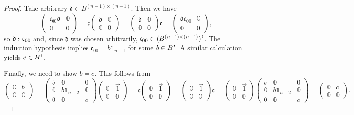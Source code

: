 \begin{proof}
Take arbitrary $\mathfrak{d} \in B^{(n-1)\times (n-1)}$. Then we have
\[ \begin{pmatrix}
\mathfrak{c}_{00}\mathfrak{d} & \mathbb{0} \\ \mathbb{0} & 0
\end{pmatrix} = \mathfrak{c}\begin{pmatrix}
\mathfrak{d} & \mathbb{0} \\ \mathbb{0} & 0
\end{pmatrix} = \begin{pmatrix}
\mathfrak{d} & \mathbb{0} \\ \mathbb{0} & 0
\end{pmatrix}\mathfrak{c} = \begin{pmatrix}
\mathfrak{d}\mathfrak{c}_{00} & \mathbb{0} \\ \mathbb{0} & 0
\end{pmatrix}, \]
so $\mathfrak{d}\comm \mathfrak{c}_{00}$ and, since $\mathfrak{d}$ was chosen arbitrarily, $\mathfrak{c}_{00} \in (B^{(n-1)\times (n-1)})^{\comm}$. The induction hypothesis implies $\mathfrak{c}_{00} = b \mathbb{1}_{n-1}$ for some $b\in B^{\comm}$. A similar calculation yields $c\in B^{\comm}$.

Finally, we need to show $b = c$. This follows from
\[ \begin{pmatrix}
\mathbb{0} & b \\ \mathbb{0} & \mathbb{0}
\end{pmatrix} = \begin{pmatrix}
b & \mathbb{0} & 0 \\
\mathbb{0} & b \mathbb{1}_{n-2} & \mathbb{0} \\
0 & \mathbb{0} & c
\end{pmatrix}\begin{pmatrix}
\mathbb{0} & \vec{1} \\ \mathbb{0} & \mathbb{0}
\end{pmatrix} = \mathfrak{c}\begin{pmatrix}
\mathbb{0} & \vec{1} \\ \mathbb{0} & \mathbb{0}
\end{pmatrix} = \begin{pmatrix}
\mathbb{0} & \vec{1} \\ \mathbb{0} & \mathbb{0}
\end{pmatrix}\mathfrak{c} = \begin{pmatrix}
\mathbb{0} & \vec{1} \\ \mathbb{0} & \mathbb{0}
\end{pmatrix}\begin{pmatrix}
b & \mathbb{0} & 0 \\
\mathbb{0} & b \mathbb{1}_{n-2} & \mathbb{0} \\
0 & \mathbb{0} & c
\end{pmatrix} = \begin{pmatrix}
\mathbb{0} & c \\ \mathbb{0} & \mathbb{0}
\end{pmatrix}. \]


\end{proof}
